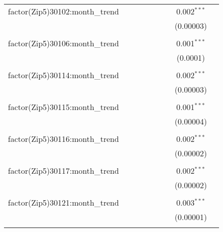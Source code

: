 \begin{table}[H]
{\begin{tabular}{@{\extracolsep{5pt}}lcccccccc}
  factor(Zip5)30102:month\_trend &  &  &  &  &  &  & 0.002$^{***}$ &  \\  

   &  &  &  &  &  &  & (0.00003) &  \\  

   & & & & & & & & \\  

  factor(Zip5)30106:month\_trend &  &  &  &  &  &  & 0.001$^{***}$ &  \\  

   &  &  &  &  &  &  & (0.0001) &  \\  

   & & & & & & & & \\  

  factor(Zip5)30114:month\_trend &  &  &  &  &  &  & 0.002$^{***}$ &  \\  

   &  &  &  &  &  &  & (0.00003) &  \\  

   & & & & & & & & \\  

  factor(Zip5)30115:month\_trend &  &  &  &  &  &  & 0.001$^{***}$ &  \\  

   &  &  &  &  &  &  & (0.00004) &  \\  

   & & & & & & & & \\  

  factor(Zip5)30116:month\_trend &  &  &  &  &  &  & 0.002$^{***}$ &  \\  

   &  &  &  &  &  &  & (0.00002) &  \\  

   & & & & & & & & \\  

  factor(Zip5)30117:month\_trend &  &  &  &  &  &  & 0.002$^{***}$ &  \\  

   &  &  &  &  &  &  & (0.00002) &  \\  

   & & & & & & & & \\  

  factor(Zip5)30121:month\_trend &  &  &  &  &  &  & 0.003$^{***}$ &  \\  

   &  &  &  &  &  &  & (0.00001) &  \\  

   & & & & & & & & \\  


\end{tabular}}
\end{table}
